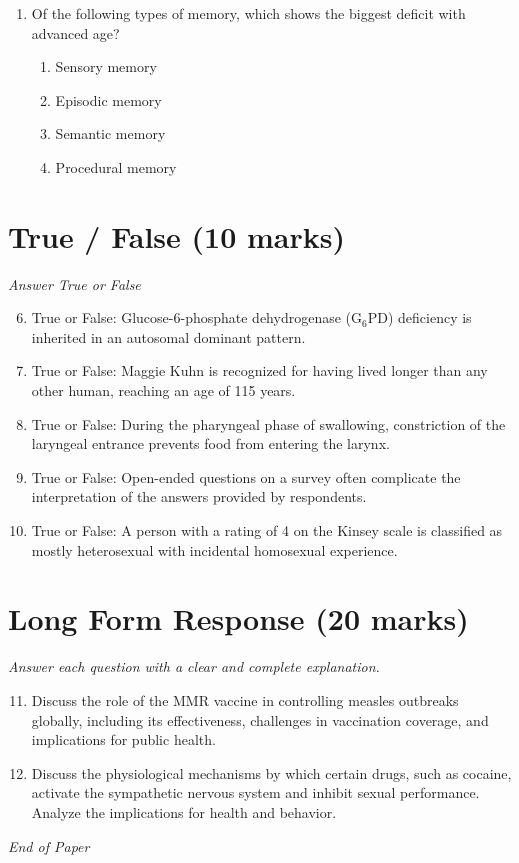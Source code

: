 \documentclass[12pt]{article}
\begin{document}
\begin{enumerate}[label=\arabic*.]
\begin{enumerate}[label=(\alph*)]
    \item provide an equal balance of punishment and reinforcement
    \item are extremely attractive and provide a lot of reinforcement
\end{enumerate}
\item Of the following types of memory, which shows the biggest deficit with advanced age?
\begin{enumerate}[label=(\alph*)]
    \item Sensory memory
    \item Episodic memory
    \item Semantic memory
    \item Procedural memory
\end{enumerate}
\end{enumerate}

\section*{True / False (10 marks)}
\textit{Answer True or False}
\begin{enumerate}[label=\arabic*.]
\setcounter{enumi}{5}
\item True or False: Glucose-6-phosphate dehydrogenase (G$_{6}$PD) deficiency is inherited in an autosomal dominant pattern.
\item True or False: Maggie Kuhn is recognized for having lived longer than any other human, reaching an age of 115 years.
\item True or False: During the pharyngeal phase of swallowing, constriction of the laryngeal entrance prevents food from entering the larynx.
\item True or False: Open-ended questions on a survey often complicate the interpretation of the answers provided by respondents.
\item True or False: A person with a rating of 4 on the Kinsey scale is classified as mostly heterosexual with incidental homosexual experience.
\end{enumerate}

\section*{Long Form Response (20 marks)}
\textit{Answer each question with a clear and complete explanation.}
\begin{enumerate}[label=\arabic*.]
\setcounter{enumi}{10}
\item Discuss the role of the MMR vaccine in controlling measles outbreaks globally, including its effectiveness, challenges in vaccination coverage, and implications for public health.
\item Discuss the physiological mechanisms by which certain drugs, such as cocaine, activate the sympathetic nervous system and inhibit sexual performance. Analyze the implications for health and behavior.
\end{enumerate}

\vfill
\noindent\textit{End of Paper}
\end{document}
